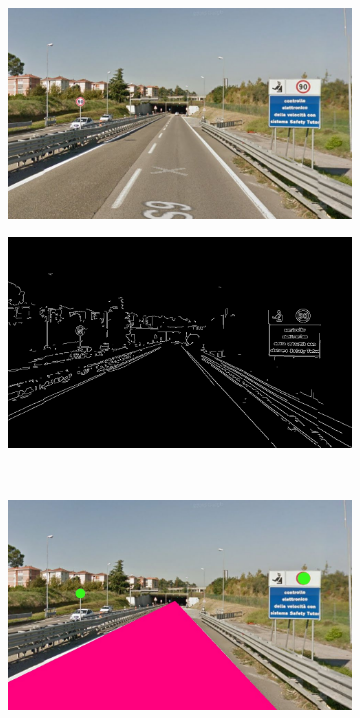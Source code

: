 \documentclass[twoside,onecolumn]{article}
\theoremstyle{definition}
\begin{document}
  
\begin{figure} \centering
\begin{subfigure}{0.45\textwidth}
  \includegraphics[width=\textwidth]{../images/road3.jpg}
\caption{ }\label{fig:r3fig}
\end{subfigure} \quad
\begin{subfigure}{0.45\textwidth}
\includegraphics[width=\textwidth]{../results/edgeMap_road3.jpg}
\caption{}\label{fig:road3edges}
\end{subfigure}\\
  \begin{subfigure}{0.6\textwidth}
\includegraphics[width=\textwidth]{../results/Circles_road3.jpg}
\caption{}\label{fig:road3circles}
\end{subfigure}\caption{}\label{fig:road3}
\end{figure}
\end{document}
